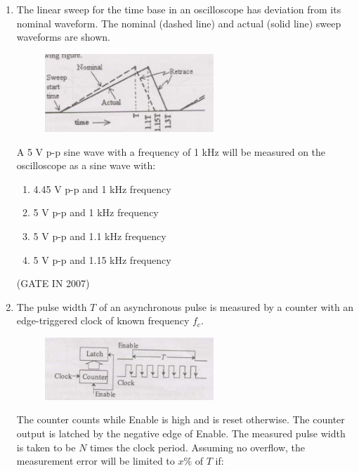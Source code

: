 \documentclass[journal]{IEEEtran}
\begin{document}
\begin{enumerate}
\begin{multicols}{2}
\begin{enumerate}
    \item low pass filter
    \item level shifter
    \item modulator
    \item precision rectifier
\end{enumerate}
\end{multicols}
\hfill(GATE IN 2007)
\item The linear sweep for the time base in an oscilloscope has deviation from its nominal waveform. The nominal (dashed line) and actual (solid line) sweep waveforms are shown. 
\begin{figure}[H]
    \centering
      \includegraphics[width=0.6\textwidth]{49.jpg} 
      \caption{}
    \label{fig:fig49} 
\end{figure}
A 5 V p-p sine wave with a frequency of 1 kHz will be measured on the oscilloscope as a sine wave with:

\begin{multicols}{2}
\begin{enumerate}
    \item 4.45 V p-p and 1 kHz frequency
    \item 5 V p-p and 1 kHz frequency
    \item 5 V p-p and 1.1 kHz frequency
    \item 5 V p-p and 1.15 kHz frequency
\end{enumerate}
\end{multicols}
\hfill(GATE IN 2007)
\item The pulse width $T$ of an asynchronous pulse is measured by a counter with an edge-triggered clock of known frequency $f_c$.
\begin{figure}[H]
    \centering
      \includegraphics[width=0.6\textwidth]{50.jpg} 
      \caption{}
    \label{fig:fig50} 
\end{figure}
The counter counts while Enable is high and is reset otherwise. The counter output is latched by the negative edge of Enable. The measured pulse width is taken to be $N$ times the clock period. Assuming no overflow, the measurement error will be limited to $x\%$ of $T$ if:


\end{enumerate}
\end{document}
